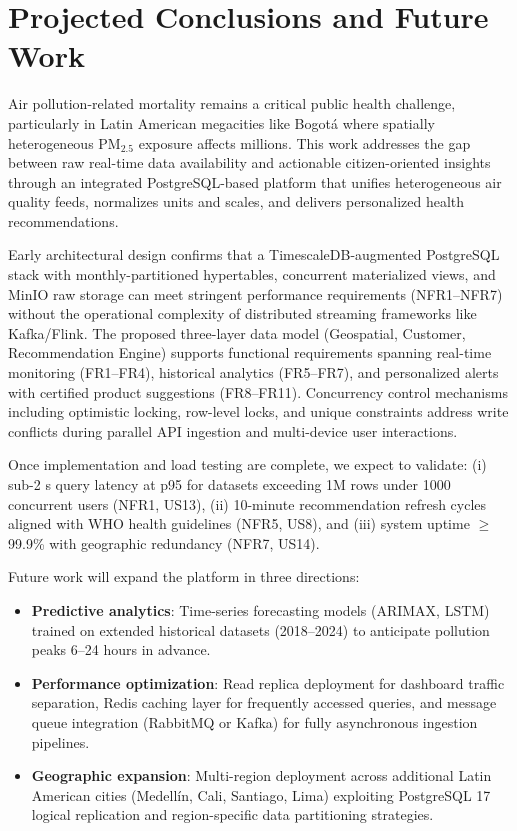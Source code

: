 \section{Projected Conclusions and Future Work}\label{sec:conclusion}
Air pollution-related mortality remains a critical public health challenge, particularly in Latin American megacities like Bogotá where spatially heterogeneous PM$_{2.5}$ exposure affects millions.  
This work addresses the gap between raw real-time data availability and actionable citizen-oriented insights through an integrated PostgreSQL-based platform that unifies heterogeneous air quality feeds, normalizes units and scales, and delivers personalized health recommendations.

Early architectural design confirms that a TimescaleDB-augmented PostgreSQL stack with monthly-partitioned hypertables, concurrent materialized views, and MinIO raw storage can meet stringent performance requirements (NFR1–NFR7) without the operational complexity of distributed streaming frameworks like Kafka/Flink.  
The proposed three-layer data model (Geospatial, Customer, Recommendation Engine) supports functional requirements spanning real-time monitoring (FR1–FR4), historical analytics (FR5–FR7), and personalized alerts with certified product suggestions (FR8–FR11).  
Concurrency control mechanisms including optimistic locking, row-level locks, and unique constraints address write conflicts during parallel API ingestion and multi-device user interactions.

Once implementation and load testing are complete, we expect to validate: (i) sub-2 s query latency at p95 for datasets exceeding 1M rows under 1000 concurrent users (NFR1, US13), (ii) 10-minute recommendation refresh cycles aligned with WHO health guidelines (NFR5, US8), and (iii) system uptime $\ge$99.9\% with geographic redundancy (NFR7, US14).

Future work will expand the platform in three directions:
\begin{itemize}
    \item \textbf{Predictive analytics}: Time-series forecasting models (ARIMAX, LSTM) trained on extended historical datasets (2018–2024) to anticipate pollution peaks 6–24 hours in advance.
    \item \textbf{Performance optimization}: Read replica deployment for dashboard traffic separation, Redis caching layer for frequently accessed queries, and message queue integration (RabbitMQ or Kafka) for fully asynchronous ingestion pipelines.
    \item \textbf{Geographic expansion}: Multi-region deployment across additional Latin American cities (Medellín, Cali, Santiago, Lima) exploiting PostgreSQL 17 logical replication and region-specific data partitioning strategies.
\end{itemize}
  
